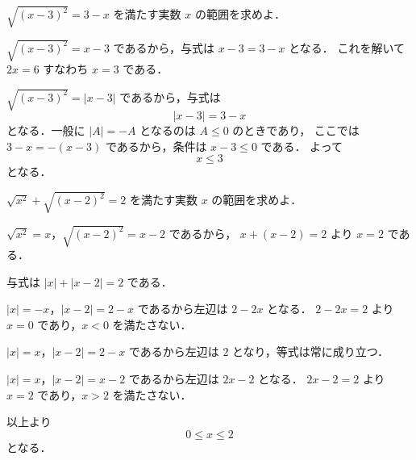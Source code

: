 \documentclass[lualatex,paper=b5j,fontsize=10pt,twoside]{jlreq}
\begin{document}
\MakeMathMagazineTitle

\begin{mmproblem}[1]{}
$\sqrt{(x-3)^2}=3-x$ を満たす実数 $x$ の範囲を求めよ．
\end{mmproblem}

\begin{msmistake}
$\sqrt{(x-3)^2}=x-3$ であるから，与式は $x-3=3-x$ となる．
これを解いて $2x=6$ すなわち $x=3$ である．
\end{msmistake}


\begin{mmsolution}
$\sqrt{(x-3)^2}=|x-3|$ であるから，与式は
\[
  |x-3|=3-x
\]
となる．一般に $|A|=-A$ となるのは $A\leq 0$ のときであり，
ここでは $3-x=-(x-3)$ であるから，条件は $x-3\leq 0$ である．
よって
\[
  x\leq 3
\]
となる．
\end{mmsolution}


\begin{mmproblem}[2]{}
$\sqrt{x^2}+\sqrt{(x-2)^2}=2$ を満たす実数 $x$ の範囲を求めよ．
\end{mmproblem}

\begin{msmistake}
$\sqrt{x^2}=x$，$\sqrt{(x-2)^2}=x-2$ であるから，
$x+(x-2)=2$ より $x=2$ である．
\end{msmistake}


\begin{mmsolution}
与式は $|x|+|x-2|=2$ である．

$|x|=-x$，$|x-2|=2-x$ であるから左辺は $2-2x$ となる．
$2-2x=2$ より $x=0$ であり，$x<0$ を満たさない．

$|x|=x$，$|x-2|=2-x$ であるから左辺は $2$ となり，等式は常に成り立つ．

$|x|=x$，$|x-2|=x-2$ であるから左辺は $2x-2$ となる．
$2x-2=2$ より $x=2$ であり，$x>2$ を満たさない．

以上より
\[
  0\leq x\leq 2
\]
となる．
\end{mmsolution}

\end{document}
